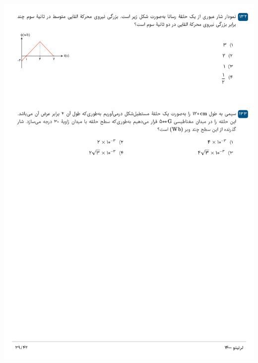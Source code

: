 \documentclass{book}
\begin{document}
\includegraphics[width=\textwidth]{"pages/39"}
\end{document}
